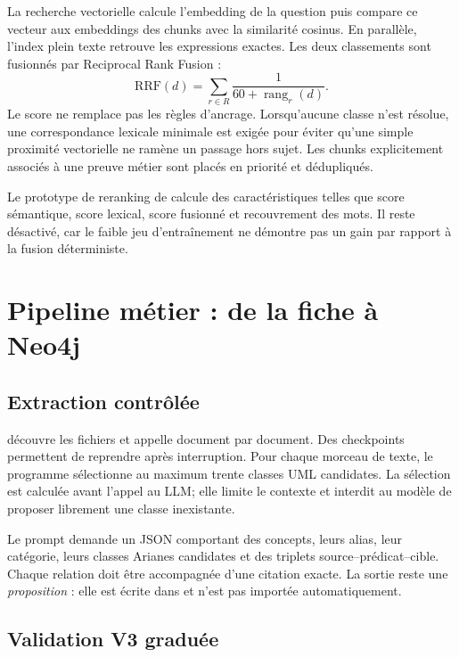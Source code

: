 La recherche vectorielle calcule l'embedding de la question puis compare ce vecteur aux
embeddings des chunks avec la similarité cosinus. En parallèle, l'index plein texte retrouve
les expressions exactes. Les deux classements sont fusionnés par Reciprocal Rank Fusion :
\[
  \mathrm{RRF}(d)=\sum_{r\in R}\frac{1}{60+\operatorname{rang}_{r}(d)}.
\]
Le score ne remplace pas les règles d'ancrage. Lorsqu'aucune classe n'est résolue, une
correspondance lexicale minimale est exigée pour éviter qu'une simple proximité vectorielle
ne ramène un passage hors sujet. Les chunks explicitement associés à une preuve métier sont
placés en priorité et dédupliqués.

Le prototype de reranking de  calcule des caractéristiques telles que score
sémantique, score lexical, score fusionné et recouvrement des mots. Il reste désactivé, car
le faible jeu d'entraînement ne démontre pas un gain par rapport à la fusion déterministe.

\section{Pipeline métier : de la fiche à Neo4j}

\subsection{Extraction contrôlée}

 découvre les fichiers 
et appelle  document par document. Des checkpoints permettent
de reprendre après interruption. Pour chaque morceau de texte, le programme sélectionne au
maximum trente classes UML candidates. La sélection est calculée avant l'appel au LLM;
elle limite le contexte et interdit au modèle de proposer librement une classe inexistante.

Le prompt demande un JSON comportant des concepts, leurs alias, leur catégorie, leurs
classes Arianes candidates et des triplets source--prédicat--cible. Chaque relation doit
être accompagnée d'une citation exacte. La sortie reste une \emph{proposition} : elle est
écrite dans  et n'est pas importée automatiquement.

\subsection{Validation V3 graduée}

